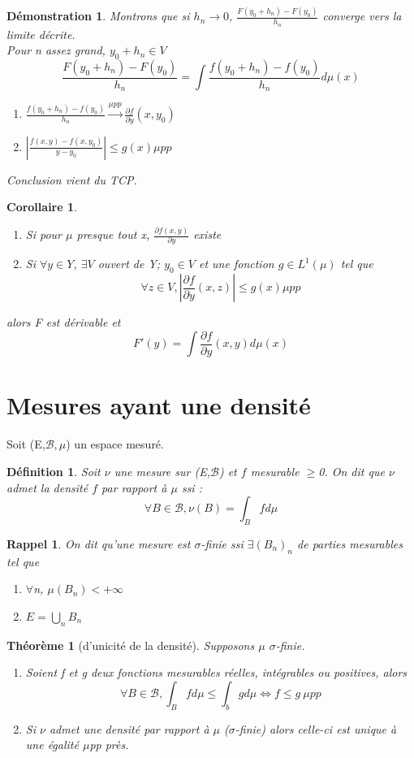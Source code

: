 \documentclass{article}
\theoremstyle{mes_theoremes}
\newtheorem{coro}{Corollaire}[section]
\newtheorem{theo}{Théorème}[section]
\newtheorem*{Def}{Définition}
\newtheorem*{dem}{Démonstration}
\newtheorem*{rap}{Rappel}
\begin{document}
\begin{dem}
Montrons que si $h_n \rightarrow 0$, $\frac{F(y_0+h_n)-F(y_0)}{h_n}$ converge vers la limite décrite. \\
Pour n assez grand, $y_0+h_n\in V$ \[\frac{F(y_0+h_n)-F(y_0)}{h_n}=\int \frac{f(y_0+h_n)-f(y_0)}{h_n} d\mu(x)\]
\begin{enumerate}
\item $\frac{f(y_0+h_n)-f(y_0)}{h_n} \xrightarrow{\mu pp} \frac{\partial f}{\partial y} (x,y_0)$
\item $\left|\frac{f(x,y)-f(x,y_0)}{y-y_0}\right|\leq g(x) \mu pp$
\end{enumerate}
Conclusion vient du TCP.
\end{dem}

\begin{coro}
\begin{enumerate}
\item Si pour $\mu$ presque tout x, $\frac{\partial f(x,y)}{\partial y}$ existe
\item Si $\forall y\in Y$, $\exists V$ ouvert de Y; $y_0\in V$ et une fonction $g\in L^1(\mu)$ tel que \[\forall z\in V, \left|\frac{\partial f}{\partial y} (x,z)\right|\leq g(x) \mu pp\]
\end{enumerate}
alors F est dérivable et \[F'(y)=\int \frac{\partial f}{\partial y} (x,y) d\mu(x)\]
\end{coro}

\newpage
\part{Mesures ayant une densité}
Soit (E,$\mathcal{B},\mu$) un espace mesuré.
\begin{Def}
Soit $\nu$ une mesure sur (E,$\mathcal{B}$) et $f$ mesurable $\geq$0. On dit que $\nu$ admet la densité $f$ par rapport à $\mu$ ssi : \[\forall B\in \mathcal{B}, \nu(B)=\int_B f d\mu\]
\end{Def}

\begin{rap}
On dit qu'une mesure est $\sigma$-finie ssi $\exists(B_n)_n$ de parties mesurables tel que
\begin{enumerate}
\item $\forall$n, $\mu(B_n)<+\infty$
\item $E=\bigcup_n B_n$
\end{enumerate}
\end{rap}

\begin{theo}[d'unicité de la densité]
Supposons $\mu$ $\sigma$-finie.
\begin{enumerate}
\item Soient f et g deux fonctions mesurables réelles, intégrables ou positives, alors \[\forall B\in \mathcal{B}, \int_B fd\mu \leq \int_b gd\mu \Leftrightarrow f\leq g\ \mu pp\]
\item Si $\nu$ admet une densité par rapport à $\mu$ ($\sigma$-finie) alors celle-ci est unique à une égalité $\mu$pp près.
\end{enumerate}
\end{theo}
\end{document}
